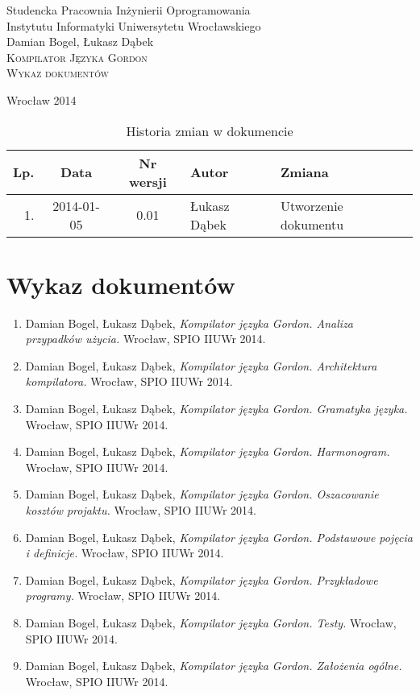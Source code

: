 \documentclass{documentation}
\begin{document}
\begin{titlepage}
\begin{center}
Studencka Pracownia Inżynierii Oprogramowania\\
Instytutu Informatyki Uniwersytetu Wrocławskiego\\[6cm]

Damian Bogel, Łukasz Dąbek\\[1cm]
\textsc{\LARGE Kompilator Języka Gordon}\\[0.5cm]
\textsc{\large Wykaz dokumentów}

\vfill
Wrocław 2014 \\[2.5cm]

\end{center}
\end{titlepage}

\newpage
\begin{table}
	\centering
    \captionsetup{name=Tabela}
	\caption{Historia zmian w dokumencie}
		\begin{tabular}{|r|c|c|l|l|}
		\hline
		Lp.  & Data       & Nr wersji & Autor                 & Zmiana \\ \hline
		1.   & 2014-01-05 & 0.01 & Łukasz Dąbek & Utworzenie dokumentu \\ \hline
	\end{tabular}
\end{table}
\newpage

\tableofcontents
\setcounter{page}{2}

\newpage

\section{Wykaz dokumentów}

\begin{enumerate}
    \item Damian Bogel, Łukasz Dąbek, \emph{Kompilator języka Gordon. Analiza przypadków użycia.} Wrocław, SPIO IIUWr 2014.
    \item Damian Bogel, Łukasz Dąbek, \emph{Kompilator języka Gordon. Architektura kompilatora.} Wrocław, SPIO IIUWr 2014.
    \item Damian Bogel, Łukasz Dąbek, \emph{Kompilator języka Gordon. Gramatyka języka.} Wrocław, SPIO IIUWr 2014.
    \item Damian Bogel, Łukasz Dąbek, \emph{Kompilator języka Gordon. Harmonogram.} Wrocław, SPIO IIUWr 2014.
    \item Damian Bogel, Łukasz Dąbek, \emph{Kompilator języka Gordon. Oszacowanie kosztów projaktu.} Wrocław, SPIO IIUWr 2014.
    \item Damian Bogel, Łukasz Dąbek, \emph{Kompilator języka Gordon. Podstawowe pojęcia i definicje.} Wrocław, SPIO IIUWr 2014.
    \item Damian Bogel, Łukasz Dąbek, \emph{Kompilator języka Gordon. Przykładowe programy.} Wrocław, SPIO IIUWr 2014.
    \item Damian Bogel, Łukasz Dąbek, \emph{Kompilator języka Gordon. Testy.} Wrocław, SPIO IIUWr 2014.
    \item Damian Bogel, Łukasz Dąbek, \emph{Kompilator języka Gordon. Założenia ogólne.} Wrocław, SPIO IIUWr 2014.
\end{enumerate}
\end{document}
